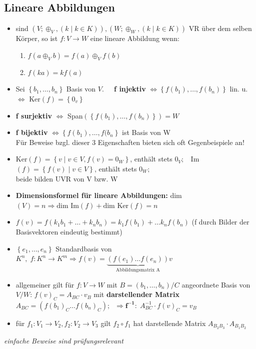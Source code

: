 \documentclass[10pt,a4paper]{article}
\begin{document}
\subsection{Lineare Abbildungen}
\begin{itemize}
\item sind $(V; \oplus_{V}, (k\mid k\in K)),(W; \oplus_{W}, (k\mid k\in K))$ VR über dem selben Körper, so ist $f:V \rightarrow W$ eine lineare Abbildung wenn:
\begin{enumerate}
\item $f(a \oplus_{V} b) =f(a)\oplus_{V} f(b)$
\item $f(ka)=kf(a)$
\end{enumerate}


\item Sei $\left\lbrace b_{1},\dotsc,b_{n}\right\rbrace$ Basis von $V.\;\;\;\;$   \textbf{f injektiv} $\Leftrightarrow \left\lbrace f(b_{1}), \dotsc,f(b_{n}) \right\rbrace $ lin. u. $\Leftrightarrow$ Ker$(f)=\left\lbrace 0_{v} \right\rbrace$
\item \textbf{f surjektiv} $\Leftrightarrow$ Span$(\left\lbrace f(b_{1}), \dotsc,f(b_{n}) \right\rbrace)=W$
\item \textbf{f bijektiv} $\Leftrightarrow \left\lbrace f(b_{1}), \dotsc,f(b_{n}\right\rbrace$ ist Basis von W\\ Für Beweise bzgl. dieser 3 Eigenschaften bieten sich oft Gegenbeispiele an!
\item Ker$(f)=\left\lbrace v \mid v \in V, f(v)=0_{W}\right\rbrace$, enthält stets $0_{V};\;\;$ Im$(f)=\left\lbrace f(v) \mid v\in V\right\rbrace$, enthält stets $0_{W};$\\ beide bilden UVR von V bzw. W 
\item \textbf{Dimensionsformel für lineare Abbildungen:} dim$(V)=n\Rightarrow\text{dim Im}(f)+\text{dim Ker}(f)=n$
\item $f(v)=f(k_{1}b_{1}+\dotsc + k_{n}b_{n})=k_{1}f(b_{1})+\dotsc k_{n}f(b_{n})$ (f durch Bilder der Basisvektoren eindeutig bestimmt)
\item $\left\lbrace e_{1},\dotsc,e_{n}\right\rbrace$ Standardbasis von $K^{n},\;f: K^{n}\rightarrow K^{m}\Rightarrow f(v)=\underbrace{(f(e_{1})\dotsc f(e_{n}))}_{\text{Abbildungsmatrix A}}v$
\item allgemeiner gilt für $f:V\rightarrow W$ mit $B=(b_{1},\dotsc,b_{n})/C$ angeordnete Basis von $V/W$: $f(v)_{C}=A_{BC}\cdot v_{B}$ mit \textbf{darstellender Matrix} $A_{BC}=(f(b_{1})_{C}\dotsc f(b_{n})_{C});\;\;\Rightarrow\boldsymbol{f^{-1}:}\; A_{BC}^{-1}\cdot f(v)_{C}=v_{B} $ 
\item für $f_{1}:V_{1}\rightarrow V_{2},f_{2}:V_{2}\rightarrow V_{3}$ gilt $f_{2}\circ f_{1}$ hat darstellende Matrix $A_{B_{2}B_{3}}\cdot A_{B_{1}B_{2}}$
\end{itemize}
\textit{einfache Beweise sind prüfungsrelevant}
\end{document}
